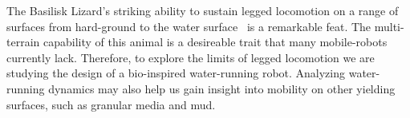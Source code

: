 The Basilisk Lizard's striking ability to sustain legged locomotion on a range of surfaces from hard-ground to the water surface~\cite{glasheen1996hydrodynamic} is a remarkable feat. The multi-terrain capability of this animal is a desireable trait that many mobile-robots currently lack. Therefore, to explore the limits of legged locomotion we are studying the design of a bio-inspired water-running robot. Analyzing water-running dynamics may also help us gain insight into mobility on other yielding surfaces, such as granular media and mud.
